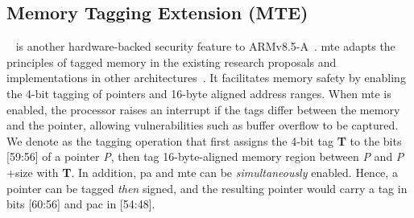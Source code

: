 \subsection{Memory Tagging Extension (MTE)}
\label{sec:background:mte}
\emph{}~\cite{mte} is another hardware-backed security feature to ARMv8.5-A~\cite{arm-arch}.
\Gls{mte} adapts the principles of tagged memory in the existing research proposals and implementations in other architectures~\cite{timber-v,hw-tagged-memory,sparc-adi}. 
It facilitates memory safety by enabling the 4-bit tagging of pointers and 16-byte aligned address ranges.
When \gls{mte} is enabled, the processor raises an interrupt if the tags differ between the memory and the pointer, allowing vulnerabilities such as buffer overflow to be captured.
We denote  as the tagging operation that first assigns the 4-bit tag \textbf{T} to the bits [59:56] of a pointer \emph{P}, then tag 16-byte-aligned memory region between \emph{P} and \emph{P}$+$size with \textbf{T}.
In addition, \gls{pa} and \gls{mte} can be \emph{simultaneously} enabled.
Hence, a pointer can be tagged \emph{then} signed, and the resulting pointer would carry a tag in bits [60:56] and \gls{pac} in [54:48].



